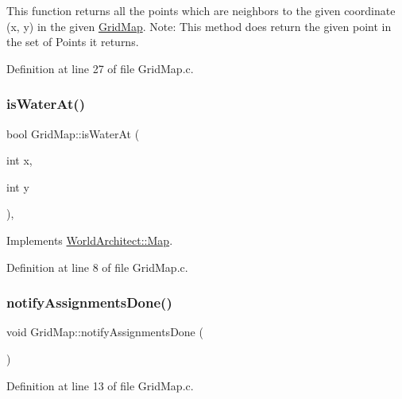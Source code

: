This function returns all the points which are neighbors to the given coordinate (x, y) in the given \mbox{\hyperlink{class_world_architect_1_1_grid_map}{Grid\+Map}}. Note\+: This method does return the given point in the set of Points it returns. 

Definition at line 27 of file Grid\+Map.\+c.

\mbox{\label{class_world_architect_1_1_grid_map_ae4562a4b2e6db010954854d64d1c5103}} 
\subsubsection{\texorpdfstring{isWaterAt()}{isWaterAt()}}
{\footnotesize\ttfamily bool Grid\+Map\+::is\+Water\+At (\begin{DoxyParamCaption}\item[{int}]{x,  }\item[{int}]{y }\end{DoxyParamCaption})\hspace{0.3cm}{\ttfamily [override]}, {\ttfamily [virtual]}}



Implements \mbox{\hyperlink{class_world_architect_1_1_map_a9bc642e73c611d59d5185c7973c8bd09}{World\+Architect\+::\+Map}}.



Definition at line 8 of file Grid\+Map.\+c.

\mbox{\label{class_world_architect_1_1_grid_map_ac3ccd253b5ab9e734df8286399241ea1}} 
\subsubsection{\texorpdfstring{notifyAssignmentsDone()}{notifyAssignmentsDone()}}
{\footnotesize\ttfamily void Grid\+Map\+::notify\+Assignments\+Done (\begin{DoxyParamCaption}{ }\end{DoxyParamCaption})}



Definition at line 13 of file Grid\+Map.\+c.

